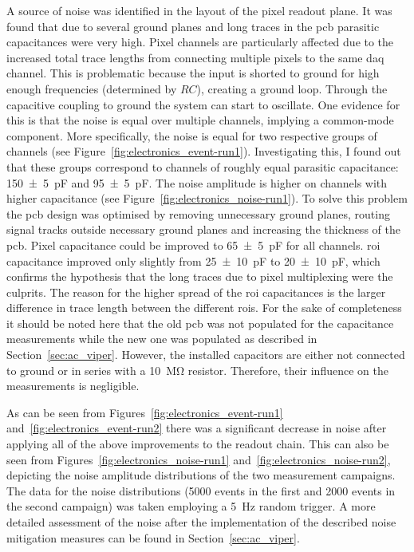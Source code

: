 A source of noise was identified in the layout of the pixel readout plane.
It was found that due to several ground planes and long traces in the \gls{pcb} parasitic capacitances were very high.
Pixel channels are particularly affected due to the increased total trace lengths from connecting multiple pixels to the same \gls{daq} channel.
This is problematic because the input is shorted to ground for high enough frequencies (determined by $RC$), creating a ground loop.
Through the capacitive coupling to ground the system can start to oscillate.
One evidence for this is that the noise is equal over multiple channels, implying a common-mode component.
More specifically, the noise is equal for two respective groups of channels (see Figure~\ref{fig:electronics_event-run1}).
Investigating this, I found out that these groups correspond to channels of roughly equal parasitic capacitance: \SI{150 +- 5}{\pico\farad} and \SI{95 +- 5}{\pico\farad}.
The noise amplitude is higher on channels with higher capacitance (see Figure~\ref{fig:electronics_noise-run1}).
To solve this problem the \gls{pcb} design was optimised by removing unnecessary ground planes, routing signal tracks outside necessary ground planes and increasing the thickness of the \gls{pcb}.
Pixel capacitance could be improved to \SI{65 +- 5}{\pico\farad} for all channels.
\gls{roi} capacitance improved only slightly from \SI{25 +- 10}{\pico\farad} to \SI{20 +- 10}{\pico\farad}, which confirms the hypothesis that the long traces due to pixel multiplexing were the culprits.
The reason for the higher spread of the \gls{roi} capacitances is the larger difference in trace length between the different \glspl{roi}.
For the sake of completeness it should be noted here that the old \gls{pcb} was not populated for the capacitance measurements while the new one was populated as described in Section~\ref{sec:ac_viper}.
However, the installed capacitors are either not connected to ground or in series with a \SI{10}{\mega\ohm} resistor.
Therefore, their influence on the measurements is negligible.

As can be seen from Figures~\ref{fig:electronics_event-run1} and~\ref{fig:electronics_event-run2} there was a significant decrease in noise after applying all of the above improvements to the readout chain.
This can also be seen from Figures~\ref{fig:electronics_noise-run1} and~\ref{fig:electronics_noise-run2}, depicting the noise amplitude distributions of the two measurement campaigns.
The data for the noise distributions (\num{5000} events in the first and \num{2000} events in the second campaign) was taken employing a \SI{5}{\hertz} random trigger.
A more detailed assessment of the noise after the implementation of the described noise mitigation measures can be found in Section~\ref{sec:ac_viper}.

